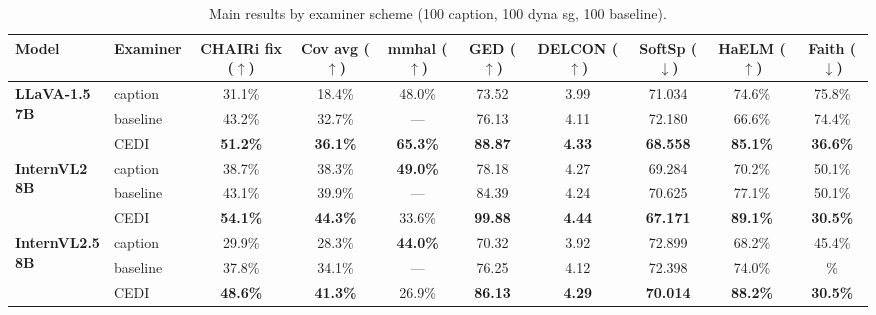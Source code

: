 
\begin{table}[t]
\centering
\tiny
\caption{Main results by examiner scheme (100 caption, 100 dyna sg, 100 baseline).}
\label{tab:main-exam}
\begin{tabular}{@{}l|l|cccccccc@{}}
\toprule
\textbf{Model} & \textbf{Examiner} & CHAIRi fix ($\uparrow$) & Cov avg ($\uparrow$) & mmhal ($\uparrow$) & GED ($\uparrow$) & DELCON ($\uparrow$) & SoftSp ($\downarrow$) & HaELM ($\uparrow$) & Faith ($\downarrow$) \\
\midrule
\multirow{3}{*}{\parbox{2.5cm}{\centering\textbf{LLaVA-1.5}\\ \textbf{7B}}} & caption & 31.1\% & 18.4\% & 48.0\% & 73.52 & 3.99 & 71.034 & 74.6\% & 75.8\% \\
 & baseline & 43.2\% & 32.7\% & --- & 76.13 &  4.11 & 72.180 & 66.6\% & 74.4\% \\
\rowcolor[HTML]{E6F2FF}
 \multicolumn{1}{l}{\cellcolor[HTML]{E6F2FF}} & CEDI & \textbf{51.2\%} & \textbf{36.1\%} & \textbf{65.3\%} & \textbf{88.87} & \textbf{4.33} & \textbf{68.558} & \textbf{85.1\%} & \textbf{36.6\%} \\
\midrule

\multirow{3}{*}{\parbox{2.5cm}{\centering\textbf{InternVL2}\\ \textbf{8B}}} & caption & 38.7\% & 38.3\% & \textbf{49.0\%} & 78.18 & 4.27 & 69.284 & 70.2\% & 50.1\% \\
 & baseline & 43.1\% & 39.9\% & --- & 84.39 &  4.24 & 70.625 & 77.1\% & 50.1\% \\
\rowcolor[HTML]{E6F2FF}
 \multicolumn{1}{l}{\cellcolor[HTML]{E6F2FF}} & CEDI & \textbf{54.1\%} & \textbf{44.3\%} & 33.6\% & \textbf{99.88} & \textbf{4.44} & \textbf{67.171} & \textbf{89.1\%} & \textbf{30.5\%} \\
\midrule

\multirow{3}{*}{\parbox{2.5cm}{\centering\textbf{InternVL2.5}\\ \textbf{8B}}} & caption & 29.9\% & 28.3\% & \textbf{44.0\%} & 70.32 & 3.92 & 72.899 & 68.2\% & 45.4\% \\
 & baseline & 37.8\% & 34.1\% & --- & 76.25 &  4.12 & 72.398 & 74.0\% & \% \\
\rowcolor[HTML]{E6F2FF}
 \multicolumn{1}{l}{\cellcolor[HTML]{E6F2FF}} & CEDI & \textbf{48.6\%} & \textbf{41.3\%} & 26.9\% & \textbf{86.13} & \textbf{4.29} & \textbf{70.014} & \textbf{88.2\%} & \textbf{30.5\%} \\
\midrule


\end{tabular}
\end{table}
